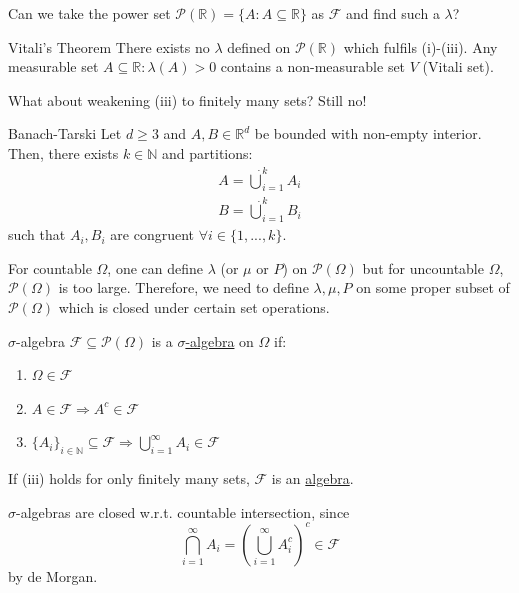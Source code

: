\documentclass{article}
\begin{document}
	Can we take the power set $\mathcal{P}(\mathbb{R})=\{A : A\subseteq \mathbb{R}\}$ as $\mathcal{F}$ and find such a $\lambda$?
	
	\begin{mythm}{Vitali's Theorem}{}
		There exists no $\lambda$ defined on $\mathcal{P}(\mathbb{R})$ which fulfils (i)-(iii). Any measurable set $A\subseteq\mathbb{R}: \lambda(A)>0$ contains a non-measurable set $V$ (Vitali set). 
	\end{mythm}
	
	What about weakening (iii) to finitely many sets? Still no!
	
	\begin{mythm}{Banach-Tarski}{}
		Let $d\geq 3$ and $A, B\in \mathbb{R}^d$ be bounded with non-empty interior. Then, there exists $k\in\mathbb{N}$ and partitions:
		\begin{align*}
			A=\dot\bigcup_{i=1}^kA_i\\
			B=\dot\bigcup_{i=1}^kB_i
		\end{align*}
		such that $A_i, B_i$ are congruent $\forall i\in \{1,..., k\}$.
	\end{mythm}
	
	For countable $\Omega$, one can define $\lambda$ (or $\mu$ or $P$) on $\mathcal{P}(\Omega)$ but for uncountable $\Omega$, $\mathcal{P}(\Omega)$ is too large. Therefore, we need to define $\lambda, \mu, P$ on some proper subset of $\mathcal{P}(\Omega)$ which is closed under certain set operations.
	
	\begin{mydef}{$\sigma$-algebra}{}
		$\mathcal{F}\subseteq\mathcal{P}(\Omega)$ is a \underline{$\sigma$-algebra} on $\Omega$ if:
		\begin{enumerate}[label=(\roman*)]
			\item $\Omega\in\mathcal{F}$
			\item $A\in\mathcal{F}\Rightarrow A^c\in\mathcal{F}$
			\item $\{A_i\}_{i\in\mathbb{N}}\subseteq\mathcal{F}\Rightarrow\bigcup_{i=1}^{\infty}A_i\in\mathcal{F}$
		\end{enumerate}
		If (iii) holds for only finitely many sets, $\mathcal{F}$ is an \underline{algebra}.
	\end{mydef}
	
	\begin{myrem}{}{}
		$\sigma$-algebras are closed w.r.t. countable intersection, since
		\begin{equation*}
			\bigcap_{i=1}^{\infty}A_i=(\bigcup_{i=1}^{\infty}A_i^c)^c\in\mathcal{F}
		\end{equation*}
		by de Morgan.
	\end{myrem}
	
\end{document}
